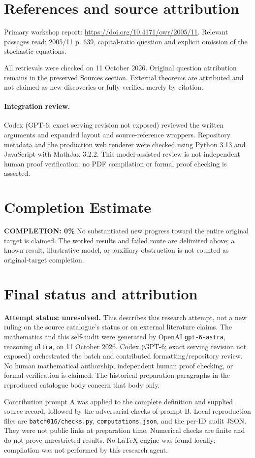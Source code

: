 \documentclass[11pt]{article}
\begin{document}
\section{References and source attribution}
Primary workshop report: \url{https://doi.org/10.4171/owr/2005/11}. Relevant passages read: 2005/11 p. 639, capital-ratio question and explicit omission of the stochastic equations.

All retrievals were checked on 11 October 2026. Original question attribution remains in the preserved Sources section. External theorems are attributed and not claimed as new discoveries or fully verified merely by citation.


\paragraph{Integration review.} Codex (GPT-6; exact serving revision not exposed) reviewed the written arguments and expanded layout and source-reference wrappers. Repository metadata and the production web renderer were checked using Python 3.13 and JavaScript with MathJax 3.2.2. This model-assisted review is not independent human proof verification; no PDF compilation or formal proof checking is asserted.

\section{Completion Estimate}
\noindent\textbf{COMPLETION: 0\%}
No substantiated new progress toward the entire original target is claimed. The worked results and failed route are delimited above; a known result, illustrative model, or auxiliary obstruction is not counted as original-target completion.

\section{Final status and attribution}
\textbf{Attempt status: unresolved.} This describes this research attempt, not a new ruling on the source catalogue's status or on external literature claims.
The mathematics and this self-audit were generated by OpenAI \texttt{gpt-6-astra}, reasoning \texttt{ultra}, on 11 October 2026. Codex (GPT-6; exact serving revision not exposed) orchestrated the batch and contributed formatting/repository review. No human mathematical authorship, independent human proof checking, or formal verification is claimed. The historical preparation paragraphs in the reproduced catalogue body concern that body only.

Contribution prompt A was applied to the complete definition and supplied source record, followed by the adversarial checks of prompt B. Local reproduction files are \texttt{batch016/checks.py}, \texttt{computations.json}, and the per-ID audit JSON. They were not public links at preparation time. Numerical checks are finite and do not prove unrestricted results. No LaTeX engine was found locally; compilation was not performed by this research agent.
\end{document}
